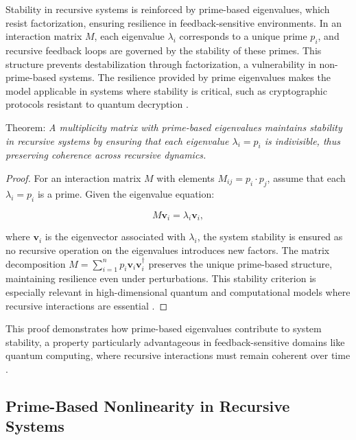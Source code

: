 \documentclass{article}
\begin{document}
Stability in recursive systems is reinforced by prime-based eigenvalues, which resist factorization, ensuring resilience in feedback-sensitive environments. In an interaction matrix \( M \), each eigenvalue \( \lambda_i \) corresponds to a unique prime \( p_i \), and recursive feedback loops are governed by the stability of these primes. This structure prevents destabilization through factorization, a vulnerability in non-prime-based systems. The resilience provided by prime eigenvalues makes the model applicable in systems where stability is critical, such as cryptographic protocols resistant to quantum decryption \citep{rivest1978, nist2016}.

Theorem: \textit{A multiplicity matrix with prime-based eigenvalues maintains stability in recursive systems by ensuring that each eigenvalue \( \lambda_i = p_i \) is indivisible, thus preserving coherence across recursive dynamics.}

\begin{proof}
For an interaction matrix \( M \) with elements \( M_{ij} = p_i \cdot p_j \), assume that each \( \lambda_i = p_i \) is a prime. Given the eigenvalue equation:

\begin{equation}
M \mathbf{v}_i = \lambda_i \mathbf{v}_i,
\end{equation}

where \( \mathbf{v}_i \) is the eigenvector associated with \( \lambda_i \), the system stability is ensured as no recursive operation on the eigenvalues introduces new factors. The matrix decomposition \( M = \sum_{i=1}^{n} p_i \mathbf{v}_i \mathbf{v}_i^{\dagger} \) preserves the unique prime-based structure, maintaining resilience even under perturbations. This stability criterion is especially relevant in high-dimensional quantum and computational models where recursive interactions are essential \citep{shor1997, gottesman1997}.
\end{proof}

This proof demonstrates how prime-based eigenvalues contribute to system stability, a property particularly advantageous in feedback-sensitive domains like quantum computing, where recursive interactions must remain coherent over time \citep{nielsen2010}.

\subsection{Prime-Based Nonlinearity in Recursive Systems}
\end{document}
